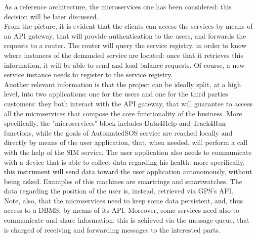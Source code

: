 As a reference architecture, the microservices one has been considered: this decision will be later discussed. \\
From the picture, it is evident that the clients can access the services by means of an API gateway, that will provide authentication 
to the users, and forwards the requests to a router. 
The router will query the service registry, in order to know where instances 
of the demanded service are located: once that it retrieves this information, it will be able to send and load balance requests.
Of course, a new service instance needs to register to the service registry. \\
Another relevant information is that the project can be ideally split, at a high level, into two applications: one for the users and one for the third parties customers: they both interact with the API gateway, that will guarantee to access all the
microservices that compose the core functionality of the business.
More specifically, the "microservices" block includes Data4Help and Track4Run functions, while the goals
of AutomatedSOS service are reached locally and directly by means of the user application, that, when
needed, will perform a call with the help of the SIM service. 
The user application also needs to communicate with a device that is able to collect data regarding his health: more specifically, this
instrument will send data toward the user application autonomously, without being asked.
Examples of  this machines are smartrings and smartwatches. 
The data regarding the position of the user is, instead, retrieved via GPS's API. \\
Note, also, that the microservices need to keep some data persistent, and, thus access to a DBMS, by means
of its API. 
Moreover, some services need also to communicate and share information: this is achieved via the message queue, that is
charged of receiving and forwarding messages to the interested parts. \\

